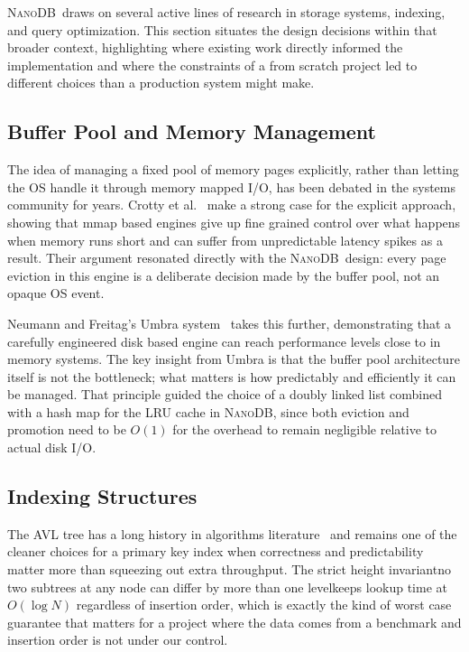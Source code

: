 \documentclass[conference]{IEEEtran}
\newcommand{\NanoDB}{\textsc{NanoDB}}
\begin{document}
\NanoDB\ draws on several active lines of research in storage systems, indexing,
and query optimization. This section situates the design decisions within that
broader context, highlighting where existing work directly informed the
implementation and where the constraints of a from scratch project led to
different choices than a production system might make.

\subsection{Buffer Pool and Memory Management}

The idea of managing a fixed pool of memory pages explicitly, rather than letting
the OS handle it through memory mapped I/O, has been debated in the systems
community for years. Crotty et al.~\cite{crotty2022} make a strong case for the
explicit approach, showing that mmap based engines give up fine grained control
over what happens when memory runs short and can suffer from unpredictable latency
spikes as a result. Their argument resonated directly with the \NanoDB\ design:
every page eviction in this engine is a deliberate decision made by the buffer
pool, not an opaque OS event.

Neumann and Freitag's Umbra system~\cite{neumann2020} takes this further,
demonstrating that a carefully engineered disk based engine can reach performance
levels close to in memory systems. The key insight from Umbra is that the buffer
pool architecture itself is not the bottleneck; what matters is how predictably
and efficiently it can be managed. That principle guided the choice of a
doubly linked list combined with a hash map for the LRU cache in \NanoDB, since
both eviction and promotion need to be $O(1)$ for the overhead to remain
negligible relative to actual disk I/O.

\subsection{Indexing Structures}

The AVL tree has a long history in algorithms literature~\cite{cormen2022} and
remains one of the cleaner choices for a primary key index when correctness and
predictability matter more than squeezing out extra throughput. The strict height
invariantno two subtrees at any node can differ by more than one levelkeeps
lookup time at $O(\log N)$ regardless of insertion order, which is exactly the
kind of worst case guarantee that matters for a project where the data comes from
a benchmark and insertion order is not under our control.
\end{document}
